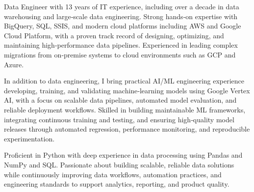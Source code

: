 

\begin{cvparagraph}

Data Engineer with 13 years of IT experience, including over a decade in data warehousing and large‑scale data engineering. Strong hands‑on expertise with BigQuery, SQL, SSIS, and modern cloud platforms including AWS and Google Cloud Platform, with a proven track record of designing, optimizing, and maintaining high‑performance data pipelines. Experienced in leading complex migrations from on‑premise systems to cloud environments such as GCP and Azure.

In addition to data engineering, I bring practical AI/ML engineering experience developing, training, and validating machine‑learning models using Google Vertex AI, with a focus on scalable data pipelines, automated model evaluation, and reliable deployment workflows. Skilled in building maintainable ML frameworks, integrating continuous training and testing, and ensuring high‑quality model releases through automated regression, performance monitoring, and reproducible experimentation.

Proficient in Python with deep experience in data processing using Pandas and NumPy and SQL. Passionate about building scalable, reliable data solutions while continuously improving data workflows, automation practices, and engineering standards to support analytics, reporting, and product quality.
\end{cvparagraph}